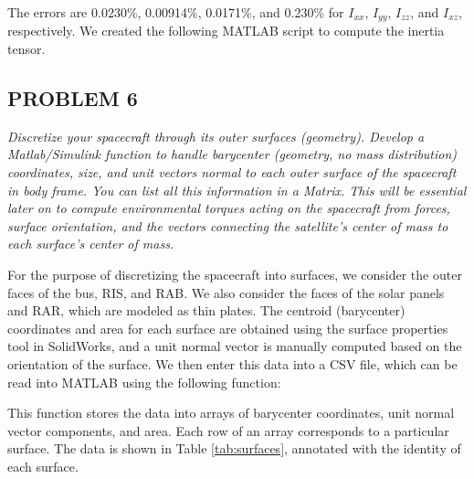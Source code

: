The errors are 0.0230\%, 0.00914\%, 0.0171\%, and 0.230\% for $I_{xx}$, $I_{yy}$, $I_{zz}$, and $I_{xz}$, respectively. We created the following MATLAB script to compute the inertia tensor.



\subsection{PROBLEM 6}
\textit{Discretize your spacecraft through its outer surfaces (geometry). Develop a Matlab/Simulink function to handle barycenter (geometry, no mass distribution) coordinates, size, and unit vectors normal to each outer surface of the spacecraft in body frame. You can list all this information in a Matrix. This will be essential later on to compute environmental torques acting on the spacecraft from forces, surface orientation, and the vectors connecting the satellite’s center of mass to each surface’s center of mass.}

For the purpose of discretizing the spacecraft into surfaces, we consider the outer faces of the bus, RIS, and RAB. We also consider the faces of the solar panels and RAR, which are modeled as thin plates. The centroid (barycenter) coordinates and area for each surface are obtained using the surface properties tool in SolidWorks, and a unit normal vector is manually computed based on the orientation of the surface. We then enter this data into a CSV file, which can be read into MATLAB using the following function:



This function stores the data into arrays of barycenter coordinates, unit normal vector components, and area. Each row of an array corresponds to a particular surface. The data is shown in Table \ref{tab:surfaces}, annotated with the identity of each surface.

